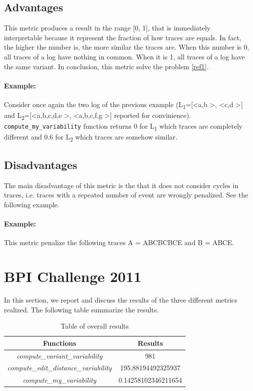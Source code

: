 \documentclass[12pt]{article}
\begin{document}
\subsection*{Advantages}

This metric produces a result in the range [0, 1], that is immediately interpretable because it represent the fraction of how traces are equals. In fact, the higher the number is, the
more similar the traces are. When this number is 0, all traces of a log have nothing in common. When it is 1, all traces of a log have the same variant. In conclusion, this metric solve the problem \ref{ref1}.

\paragraph*{Example:} Consider once again the two log of the previous example (L\textsubscript{1}=[\textless a,b \textgreater, \textless c,d \textgreater] and L\textsubscript{2}=[\textless a,b,c,d,e \textgreater, \textless a,b,c,f,g \textgreater] reported for convinience). \texttt{compute\_my\_variability} function returns 0 for L\textsubscript{1} which traces are completely different and 0.6 for L\textsubscript{2} which traces are somehow similar.

\subsection*{Disadvantages}

The main disadvantage of this metric is the that it does not consider cycles in traces, i.e. traces with a repeated number of event are wrongly penalized. See the following example.

\paragraph*{Example:} This metric penalize the following traces A = ABCBCBCE and B = ABCE.

\section*{BPI Challenge 2011}

In this section, we report and discuss the results of the three different metrics realized. The following table summarize the results.
\renewcommand{\arraystretch}{1.5}\\
\begin{table}[H]
	\centering
		\begin{tabular}{ |c|c|  }
			\hline
			Functions & Results \\
			\hline
			\textit{compute\_variant\_variability} & 981 \\ \hline
			\textit{compute\_edit\_distance\_variability} & 195.88194492325937 \\ \hline
			\textit{compute\_my\_variability} & 0.14258102346211654 \\
			\hline
		\end{tabular}
	\caption{Table of overall results}
	\label{table:1}
\end{table}
\end{document}
